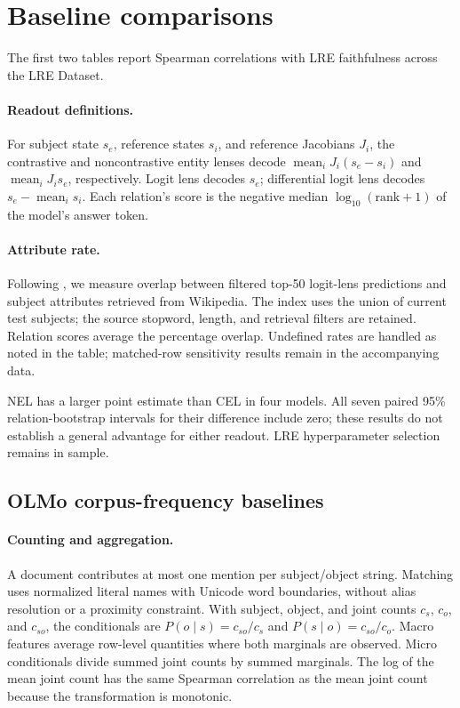 \section{Baseline comparisons}
\label{sec:shared-baselines}
The first two tables report Spearman correlations with LRE faithfulness across the LRE Dataset.




\paragraph{Readout definitions.}
For subject state $s_e$, reference states $s_i$, and reference Jacobians
$J_i$, the contrastive and noncontrastive entity lenses decode
$\operatorname{mean}_i J_i(s_e-s_i)$ and
$\operatorname{mean}_i J_i s_e$, respectively. Logit lens decodes $s_e$;
differential logit lens decodes $s_e-\operatorname{mean}_i s_i$. Each relation's score is the negative median $\log_{10}(\mathrm{rank}+1)$ of the model's answer token.

\paragraph{Attribute rate.}
Following \citet{geva-etal-2023-dissecting}, we measure overlap between filtered top-50
logit-lens predictions and subject attributes retrieved from Wikipedia.
The index uses the union of current test subjects; the source stopword,
length, and retrieval filters are retained. Relation scores average the
percentage overlap. Undefined rates are handled as noted in the table;
matched-row sensitivity results remain in the accompanying data.

NEL has a larger point estimate than CEL in four models. All seven paired 95\% relation-bootstrap intervals for their
difference include zero; these results do not establish a general advantage
for either readout. LRE hyperparameter selection remains in sample.

\clearpage
\subsection{OLMo corpus-frequency baselines}
\label{sec:corpus-freq-baselines}



\paragraph{Counting and aggregation.}
A document contributes at most one mention per subject/object string.
Matching uses normalized literal names with Unicode word boundaries,
without alias resolution or a proximity constraint. With subject, object,
and joint counts $c_s$, $c_o$, and $c_{so}$, the conditionals are
$P(o\mid s)=c_{so}/c_s$ and $P(s\mid o)=c_{so}/c_o$.
Macro features average row-level quantities where both marginals are
observed. Micro conditionals divide summed joint counts by summed
marginals. The log of the mean joint count has the same Spearman correlation
as the mean joint count because the transformation is monotonic.

